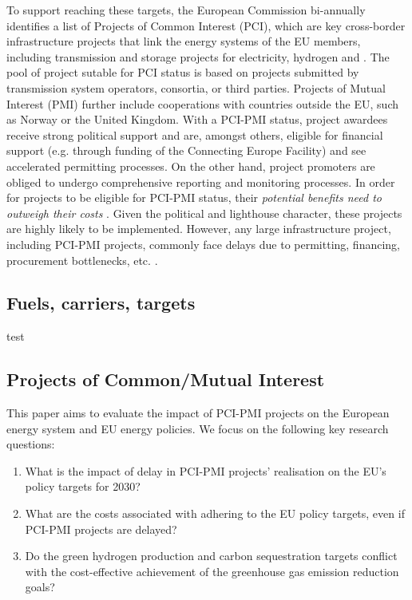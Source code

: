 \documentclass[preprint,12pt]{elsarticle}
\begin{document}
To support reaching these targets, the European Commission bi-annually identifies a list of Projects of Common Interest (PCI), which are key cross-border infrastructure projects that link the energy systems of the EU members, including transmission and storage projects for electricity, hydrogen and  \cite{europeancommissionCommissionDelegatedRegulation2023}. 
The pool of project sutable for PCI status is based on projects submitted by transmission system operators, consortia, or third parties. Projects of Mutual Interest (PMI) further include cooperations with countries outside the EU, such as Norway or the United Kingdom. With a PCI-PMI status, project awardees receive strong political support and are, amongst others, eligible for financial support (e.g. through funding of the Connecting Europe Facility) and see accelerated permitting processes. On the other hand, project promoters are obliged to undergo comprehensive reporting and monitoring processes. 
In order for projects to be eligible for PCI-PMI status, their \textit{potential benefits need to outweigh their costs} \cite{europeancommissionCommissionDelegatedRegulation2023}. Given the political and lighthouse character, these projects are highly likely to be implemented. However, any large infrastructure project, including PCI-PMI projects, commonly face delays due to permitting, financing, procurement bottlenecks, etc. \cite{acerConsolidatedReportProgress2023}.

\subsection{Fuels, carriers, targets}
test

\subsection{Projects of Common/Mutual Interest}

This paper aims to evaluate the impact of PCI-PMI projects on the European energy system and EU energy policies. We focus on the following key research questions:

\begin{enumerate} 
  \item What is the impact of delay in PCI-PMI projects' realisation on the EU's policy targets for 2030?
  \item What are the costs associated with adhering to the EU policy targets, even if PCI-PMI projects are delayed? 
  \item Do the green hydrogen production and carbon sequestration targets conflict with the cost-effective achievement of the greenhouse gas emission reduction goals? 
\end{enumerate}
\end{document}

